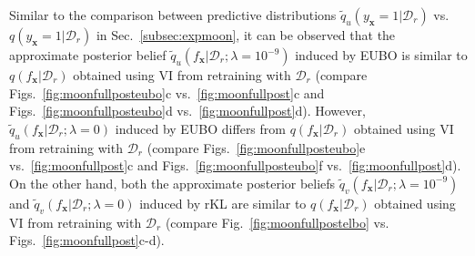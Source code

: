 \documentclass{article}
\theoremstyle{definition}
\newcommand{\mbf}[1]{\mathbf{#1}}
\newcommand{\mcl}[1]{\mathcal{#1}}
\newcommand{\dc}{\mcl{D}_r}
\newcommand{\eubo}{\tilde{q}_u}
\newcommand{\elbo}{\tilde{q}_v}
\begin{document}
%
Similar to the comparison between predictive distributions 
$\eubo(y_{\mbf{x}}=1|\dc)$ vs.~$q(y_{\mbf{x}}=1|\dc)$
in Sec.~\ref{subsec:expmoon},
it can be observed that the
approximate posterior belief $\eubo(f_{\mbf{x}}|\dc;\lambda= 10^{-9})$ induced by EUBO 
is similar to $q(f_{\mbf{x}}|\dc)$ obtained using VI from retraining with $\dc$ (compare Figs.~\ref{fig:moonfullposteubo}c vs.~\ref{fig:moonfullpost}c and Figs.~\ref{fig:moonfullposteubo}d vs.~\ref{fig:moonfullpost}d).
However, 
$\eubo(f_{\mbf{x}}|\dc;\lambda= 0)$ induced by EUBO differs
from $q(f_{\mbf{x}}|\dc)$ obtained using VI from retraining with $\dc$ (compare Figs.~\ref{fig:moonfullposteubo}e vs.~\ref{fig:moonfullpost}c and Figs.~\ref{fig:moonfullposteubo}f vs.~\ref{fig:moonfullpost}d). 
On the other hand, 
both the
approximate posterior beliefs $\elbo(f_{\mbf{x}}|\dc;\lambda= 10^{-9})$ and $\elbo(f_{\mbf{x}}|\dc;\lambda= 0)$ induced by rKL are similar to $q(f_{\mbf{x}}|\dc)$ 
obtained using VI from retraining with $\dc$ 
(compare Fig.~\ref{fig:moonfullpostelbo} vs.  Figs.~\ref{fig:moonfullpost}c-d).
%
%
%
\end{document}
